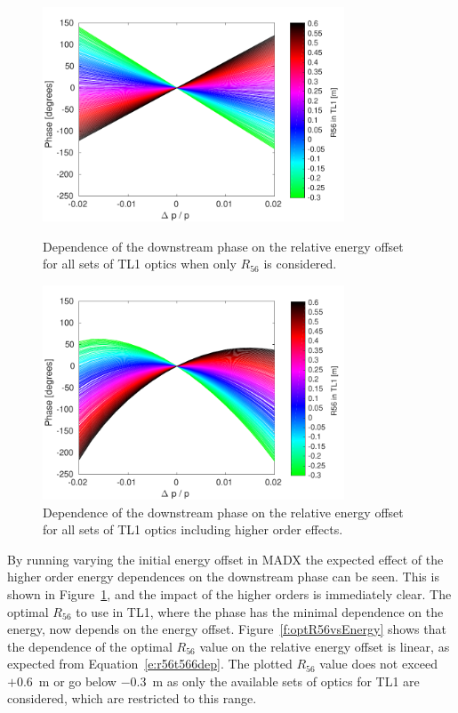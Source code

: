 \begin{figure}
  \centering
  \includegraphics[width=0.8\textwidth]{Figures/propagation/phaseVsEn_r56Only}
  \caption{Dependence of the downstream phase on the relative energy offset for all sets of TL1 optics when only \(R_{56}\) is considered.}
  \label{f:phaseVsEn_r56Only}  
  \centering
  \includegraphics[width=0.8\textwidth]{Figures/propagation/phaseVsEn_t566}
  \caption{Dependence of the downstream phase on the relative energy offset for all sets of TL1 optics including higher order effects.}
  \label{f:phaseVsEn_t566}
\end{figure}

By running varying the initial energy offset in MADX the expected effect of the higher order energy dependences on the downstream phase can be seen. This is shown in Figure~\ref{f:phaseVsEn_t566}, and the impact of the higher orders is immediately clear. The optimal \(R_{56}\) to use in TL1, where the phase has the minimal dependence on the energy, now depends on the energy offset. Figure~\ref{f:optR56vsEnergy} shows that the dependence of the optimal \(R_{56}\) value on the relative energy offset is linear, as expected from Equation~\ref{e:r56t566dep}. The plotted \(R_{56}\) value does not exceed \(+0.6\)~m or go below \(-0.3\)~m as only the available sets of optics for TL1 are considered, which are restricted to this range. %



